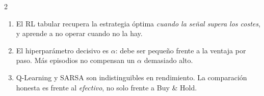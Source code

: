 \documentclass[10pt,a4paper]{article}
\newcommand{\sect}[1]{\par\vspace{3pt}{\large\bfseries #1}\par\vspace{1pt}}
\begin{document}
\begin{multicols}{2}
\sect{Conclusiones}
\begin{enumerate}[label=\arabic*.]
\item El RL tabular recupera la estrategia óptima \emph{cuando la señal supera los costes}, y aprende a no operar cuando no la hay.
\item El hiperparámetro decisivo es $\alpha$: debe ser pequeño frente a la ventaja por paso. Más episodios no compensan un $\alpha$ demasiado alto.
\item Q-Learning y SARSA son indistinguibles en rendimiento. La comparación honesta es frente al \emph{efectivo}, no solo frente a Buy \& Hold.
\end{enumerate}

\end{multicols}
\end{document}
